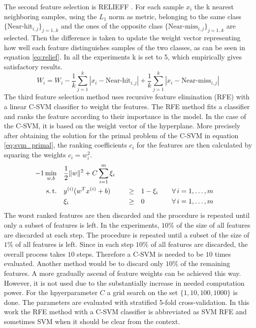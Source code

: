\documentclass[twoside,11pt]{article}
\begin{document}
The second feature selection is RELIEFF \citep{kononenko1997overcoming}. For each sample $x_i$ the k nearest neighboring samples, using the $L_1$ norm as metric, belonging to the same class $\{\textrm{Near-hit}_{i, j}\}_{j=1..k}$ and the ones of the opposite class $\{\textrm{Near-miss}_{i, j}\}_{j=1..k}$ are selected. Then the difference is taken to update the weight vector representing how well each feature distinguishes samples of the two classes, as can be seen in equation \ref{eq:relief}. In all the experiments k is set to 5, which empirically gives satisfactory results.
\begin{equation}
  \label{eq:relief}
  W_i = W_i - \frac{1}{k}\sum_{j=1}^{k}|x_i - \textrm{Near-hit}_{i,j}| + \frac{1}{k}\sum_{j=1}^{k} |x_i - \textrm{Near-miss}_{i,j}|
\end{equation}
The third feature selection method uses recursive feature elimination (RFE) with a linear C-SVM classifier \citep{guyon2002gene} to weight the features. 
The RFE method fits a classifier and ranks the feature according to their importance in the model. In the case of the C-SVM, it is based on the weight vector of the hyperplane. More precisely after obtaining the solution for the primal problem of the C-SVM in equation \ref{eq:svm_primal}, the ranking coefficients $c_i$ for the features are then calculated by squaring the weights $c_i = w_i^2$.
\begin{alignat}{-1}
     \min_{w,b}  & \quad \frac12\|w\|^2 + C\sum_{i=1}^m \xi_i & & & \label{eq:svm_primal} \\ 
   \text{s.\,t.} & \quad y^{(i)} (w^Tx^{(i)} + b) & \quad \geq & \quad 1 -\xi_i &&
                   \quad \forall \, i = 1, \ldots, m \nonumber \\
                 & \quad \xi_i                  & \quad \geq & \quad 0 &&
                   \quad \forall \, i = 1, \ldots, m \nonumber 
\end{alignat}
The worst ranked features are then discarded and the procedure is repeated until only a subset of features is left. In the experiments, $10\%$ of the size of all features are discarded at each step. The procedure is repeated until a subset of the size of $1\%$ of all features is left. Since in each step $10\%$ of all features are discarded, the overall process takes $10$ steps. Therefore a C-SVM is needed to be $10$ times evaluated. Another method would be to discard only $10\%$ of the remaining features. A more gradually ascend of feature weights can be achieved this way. However, it is not used due to the substantially increase in needed computation power. For the hpyerparameter $C$ a grid search on the set $\{1, 10, 100, 1000\}$ is done. The parameters are evaluated with stratified 5-fold cross-validation. In this work the RFE method with a C-SVM classifier is abbreviated as SVM RFE and sometimes SVM when it should be clear from the context.
\end{document}
